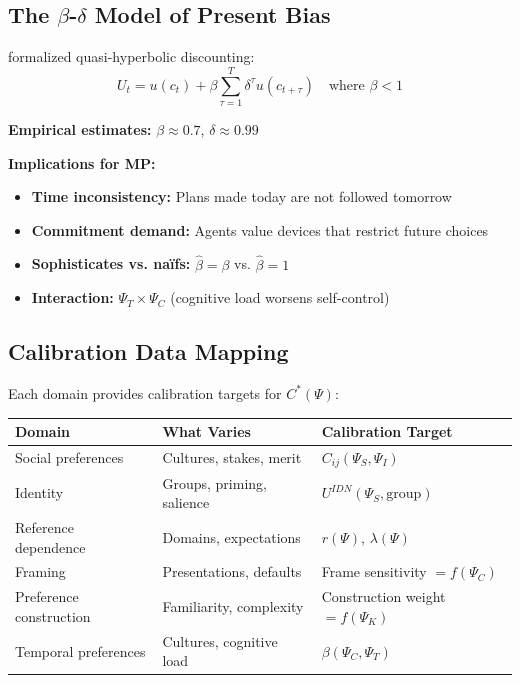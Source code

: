 \subsection{The $\beta$-$\delta$ Model of Present Bias}

\citet{laibson1997} formalized quasi-hyperbolic discounting:
\begin{equation}
\boxed{
U_t = u(c_t) + \beta \sum_{\tau=1}^{T} \delta^\tau u(c_{t+\tau}) \quad \text{where } \beta < 1
}
\label{eq:mp-beta-delta}
\end{equation}

\textbf{Empirical estimates:} $\beta \approx 0.7$, $\delta \approx 0.99$

\textbf{Implications for MP:}
\begin{itemize}
\item \textbf{Time inconsistency:} Plans made today are not followed tomorrow
\item \textbf{Commitment demand:} Agents value devices that restrict future choices
\item \textbf{Sophisticates vs. naïfs:} $\hat{\beta} = \beta$ vs. $\hat{\beta} = 1$
\item \textbf{Interaction:} $\Psi_T \times \Psi_C$ (cognitive load worsens self-control)
\end{itemize}

\subsection{Calibration Data Mapping}

Each domain provides calibration targets for $C^*(\Psi)$:

\begin{center}
\small
\renewcommand{\arraystretch}{1.2}
\begin{tabular}{@{}lll@{}}
\toprule
\textbf{Domain} & \textbf{What Varies} & \textbf{Calibration Target} \\
\midrule
Social preferences & Cultures, stakes, merit & $C_{ij}(\Psi_S, \Psi_I)$ \\
Identity & Groups, priming, salience & $U^{IDN}(\Psi_S, \text{group})$ \\
Reference dependence & Domains, expectations & $r(\Psi)$, $\lambda(\Psi)$ \\
Framing & Presentations, defaults & Frame sensitivity $= f(\Psi_C)$ \\
Preference construction & Familiarity, complexity & Construction weight $= f(\Psi_K)$ \\
Temporal preferences & Cultures, cognitive load & $\beta(\Psi_C, \Psi_T)$ \\
\bottomrule
\end{tabular}
\end{center}

